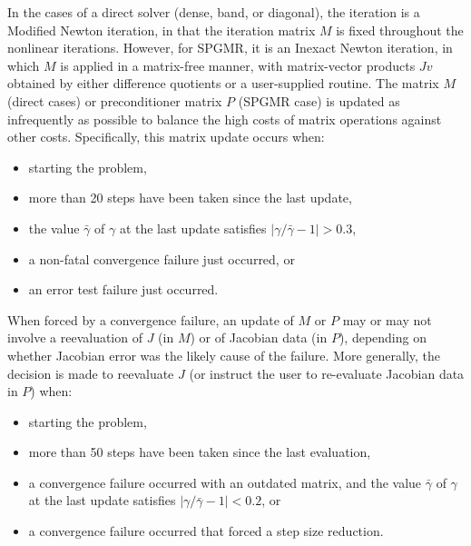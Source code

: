 In the cases of a direct solver (dense, band, or diagonal), the
iteration is a Modified Newton iteration, in that the iteration matrix
$M$ is fixed throughout the nonlinear iterations.  However, for SPGMR,
it is an Inexact Newton iteration, in which $M$ is applied in a
matrix-free manner, with matrix-vector products $Jv$ obtained by
either difference quotients or a user-supplied routine.  The matrix
$M$ (direct cases) or preconditioner matrix $P$ (SPGMR case) is
updated as infrequently as possible to balance the high costs of
matrix operations against other costs.  Specifically, this matrix
update occurs when:
\begin{itemize}
\item starting the problem,
\item more than 20 steps have been taken since the last update,
\item the value $\bar{\gamma}$ of $\gamma$ at the last update
satisfies $|\gamma/\bar{\gamma} - 1| > 0.3$,
\item a non-fatal convergence failure just occurred, or
\item an error test failure just occurred.
\end{itemize}
When forced by a convergence failure, an update of $M$ or $P$ may or
may not involve a reevaluation of $J$ (in $M$) or of Jacobian data
(in $P$), depending on whether Jacobian error was the likely cause of
the failure.  More generally, the decision is made to reevaluate $J$
(or instruct the user to re-evaluate Jacobian data in $P$) when:
\begin{itemize}
\item starting the problem,
\item more than 50 steps have been taken since the last evaluation,
\item a convergence failure occurred with an outdated matrix, and
the value $\bar{\gamma}$ of $\gamma$ at the last update
satisfies $|\gamma/\bar{\gamma} - 1| < 0.2$, or
\item a convergence failure occurred that forced a step size reduction.
\end{itemize}

